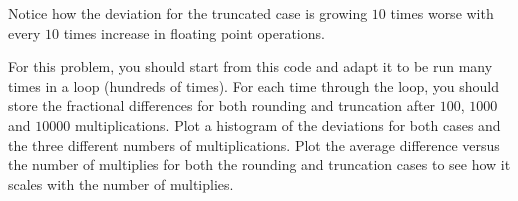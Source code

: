 Notice how the deviation for the truncated case is growing $10$ times worse with every $10$
times increase in floating point operations.

For this problem, you should start from this code and adapt it to be run many times in a
loop (hundreds of times). For each time through the loop, you should store the fractional
differences for both rounding and truncation after $100$, $1000$ and $10000$ multiplications.
Plot a histogram of the deviations for both cases and the three different numbers of
multiplications. Plot the average difference versus the number of multiplies for both the
rounding and truncation cases to see how it scales with the number of multiplies.
